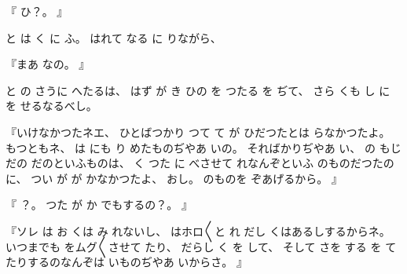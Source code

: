 %
『
ひ？。
』

%
と
は
く
に
ふ。
%
はれて
なる
に
りながら、

%
『まあ
なの。
』

%
と
の
さうに
へたるは、
%
はず
が
き
ひの
を
つたる
を
ぢて、
%
さら
くも
し
に
を
せるなるべし。

%
『いけなかつたネエ、
%
ひとばつかり
つて
て
が
ひだつたとは
らなかつたよ。
%
もつともネ、
%
は
にも
り
めたものぢやあ
いの。
%
そればかりぢやあ
い、
%
の
もじだの
だのといふものは、
%
く
つた
に
べさせて
れなんぞといふ
のものだつたのに、
%
つい
が
が
かなかつたよ、
%
おし。%
%
のものを
ぞあげるから。
』

%
『
？。
%
つた
が
か
でもするの？。
』

%
『ソレ
は%
お
くは
み
れないし、
%
はホロ〳〵と
れ
だし
くはあるしするからネ。
%
いつまでも
をムグ〳〵させて
たり、
%
だらし
く
を
して、
%
そして
さを
する
を
て
たりするのなんぞは
いものぢやあ
いからさ。
』

